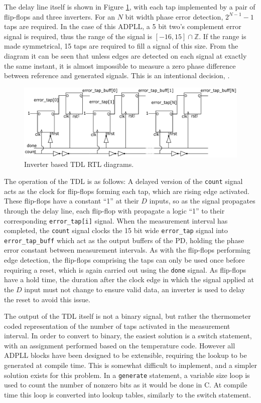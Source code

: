 The delay line itself is shown in Figure \ref{fig:tdl_impl}, with each tap implemented by a pair of flip-flops and three inverters. For an $N$ bit width phase error detection, $2^{N-1}-1$ taps are required. In the case of this \ac{ADPLL}, a 5 bit two's complement error signal is required, thus the range of the signal is $[-16,15]\cap\mathbb{Z}$. If the range is made symmetrical, 15 taps are required to fill a signal of this size. From the diagram it can be seen that unless edges are detected on each signal at exactly the same instant, it is almost impossible to measure a zero phase difference between reference and generated signals. This is an intentional decision, \cite{idkwhattocite}.
\begin{figure}[h]
    \centering
    \includegraphics[width=1.0\textwidth]{../new_pdet2}
    \caption[Inverter based \ac{TDL} RTL diagrams]{Inverter based \ac{TDL} RTL diagrams.}
    \label{fig:tdl_impl}
\end{figure}
The operation of the \ac{TDL} is as follows: A delayed version of the \texttt{count} signal acts as the clock for flip-flops forming each tap, which are rising edge activated. These flip-flops have a constant ``1'' at their $D$ inputs, so as the signal propagates through the delay line, each flip-flop with propagate a logic ``1'' to their corresponding \texttt{error\_tap[i]} signal. When the measurement interval has completed, the \texttt{count} signal clocks the 15 bit wide \texttt{error\_tap} signal into \texttt{error\_tap\_buff} which act as the output buffers of the \ac{PD}, holding the phase error constant between measurement intervals. As with the flip-flops performing edge detection, the flip-flops comprising the taps can only be used once before requiring a reset, which is again carried out using the \texttt{done} signal. As flip-flops have a hold time, the duration after the clock edge in which the signal applied at the $D$ input must not change to ensure valid data, an inverter is used to delay the reset to avoid this issue.

The output of the \ac{TDL} itself is not a binary signal, but rather the thermometer coded representation of the number of taps activated in the measurement interval. In order to convert to binary, the easiest solution is a switch statement, with an assignment performed based on the temperature code. However all \ac{ADPLL} blocks have been designed to be extensible, requiring the lookup to be generated at compile time. This is somewhat difficult to implement, and a simpler solution exists for this problem. In a \texttt{generate} statement, a variable size loop is used to count the number of nonzero bits as it would be done in C. At compile time this loop is converted into lookup tables, similarly to the switch statement.

